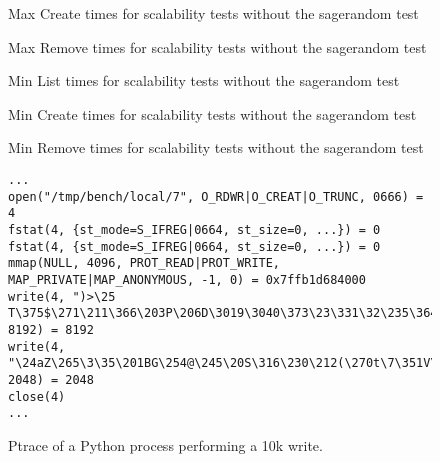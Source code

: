 \begin{figure}[!h]
\centering
{}
\caption[Max Create Times Without Random Test]{Max Create times for scalability tests without the sagerandom test}
\label{fig:norandcreatemax}
\end{figure}

\begin{figure}[!h]
\centering
{}
\caption[Max Remove Times Without Random Test]{Max Remove times for scalability tests without the sagerandom test}
\label{fig:norandremovemax}
\end{figure}

\clearpage

\begin{figure}[!h]
\centering
{}
\caption[Min List Times Without Random Test]{Min List times for scalability tests without the sagerandom test}
\label{fig:norandlistmin}
\end{figure}

\begin{figure}[!h]
\centering
{}
\caption[Min Create Times Without Random Test]{Min Create times for scalability tests without the sagerandom test}
\label{fig:norandcreatemin}
\end{figure}

\begin{figure}[!h]
\centering
{}
\caption[Min Remove Times Without Random Test]{Min Remove times for scalability tests without the sagerandom test}
\label{fig:norandremovemin}
\end{figure}


\begin{figure}[!h]
\begin{lstlisting}
...
open("/tmp/bench/local/7", O_RDWR|O_CREAT|O_TRUNC, 0666) = 4
fstat(4, {st_mode=S_IFREG|0664, st_size=0, ...}) = 0
fstat(4, {st_mode=S_IFREG|0664, st_size=0, ...}) = 0
mmap(NULL, 4096, PROT_READ|PROT_WRITE, MAP_PRIVATE|MAP_ANONYMOUS, -1, 0) = 0x7ffb1d684000
write(4, ")>\25 T\375$\271\211\366\203P\206D\3019\3040\373\23\331\32\235\364F\267\22m\vf\321\256"..., 8192) = 8192
write(4, "\24aZ\265\3\35\201BG\254@\245\20S\316\230\212(\270t\7\351V\375\267jI\30\215\355\275\4"..., 2048) = 2048
close(4)  
...
\end{lstlisting}
\caption[Python Write Ptrace]{Ptrace of a Python process performing a 10k write.}
\label{fig:writeptrace}
\end{figure}